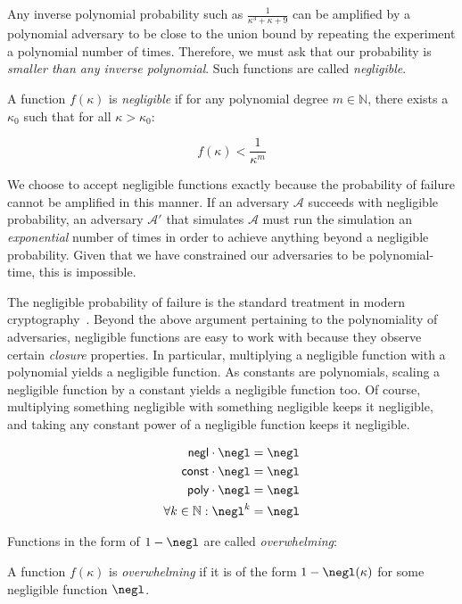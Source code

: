 Any inverse polynomial probability such as $\frac{1}{\kappa^3 + \kappa + 9}$ can be amplified by a
polynomial adversary to be close to the union bound by repeating the experiment a polynomial
number of times. Therefore, we must ask that our probability is \emph{smaller than any inverse
polynomial}. Such functions are called \emph{negligible}.

\begin{definition}
  A function $f(\kappa)$ is \emph{negligible} if for any polynomial degree
  $m \in \mathbb{N}$, there exists a $\kappa_0$ such that for all
  $\kappa > \kappa_0$:

  \[
    f(\kappa) < \frac{1}{\kappa^m}
  \]
\end{definition}

We choose to accept negligible functions exactly because the probability of failure
cannot be amplified in this manner. If an adversary $\mathcal{A}$ succeeds with negligible
probability, an adversary $\mathcal{A}'$ that simulates $\mathcal{A}$ must run the
simulation an \emph{exponential} number of times in order to achieve anything beyond
a negligible probability. Given that we have constrained our adversaries to be polynomial-time,
this is impossible.

The negligible probability of failure is the standard treatment in modern cryptography~\cite{katz}.
Beyond the above argument pertaining to the polynomiality of adversaries, negligible
functions are easy to work with because they observe certain \emph{closure} properties.
In particular, multiplying a negligible function with a polynomial yields a negligible
function. As constants are polynomials, scaling a negligible function by a constant
yields a negligible function too. Of course, multiplying something negligible with
something negligible keeps it negligible, and taking any constant power of a negligible function
keeps it negligible.

\begin{align*}
  \textsf{negl} \cdot \negl &= \negl\\
  \textsf{const} \cdot \negl &= \negl\\
  \textsf{poly} \cdot \negl &= \negl\\
  \forall k \in \mathbb{N}: \negl^k &= \negl
\end{align*}

Functions in the form of $1 - \negl$ are called \emph{overwhelming}:

\begin{definition}
  A function $f(\kappa)$ is \emph{overwhelming} if it is of the form
  $1 - \negl(\kappa)$ for some negligible function $\negl$.
\end{definition}

